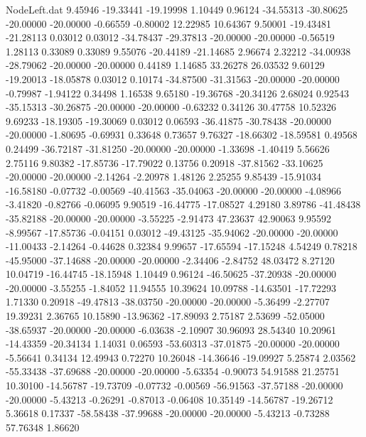 \begin{filecontents}{NodeLeft.dat}
   9.45946  -19.33441  -19.19998     1.10449    0.96124  -34.55313  -30.80625  -20.00000  -20.00000   -0.66559   -0.80002   12.22985   10.64367
   9.50001  -19.43481  -21.28113     0.03012    0.03012  -34.78437  -29.37813  -20.00000  -20.00000   -0.56519    1.28113    0.33089    0.33089
   9.55076  -20.44189  -21.14685     2.96674    2.32212  -34.00938  -28.79062  -20.00000  -20.00000    0.44189    1.14685   33.26278   26.03532
   9.60129  -19.20013  -18.05878     0.03012    0.10174  -34.87500  -31.31563  -20.00000  -20.00000   -0.79987   -1.94122    0.34498    1.16538
   9.65180  -19.36768  -20.34126     2.68024    0.92543  -35.15313  -30.26875  -20.00000  -20.00000   -0.63232    0.34126   30.47758   10.52326
   9.69233  -18.19305  -19.30069     0.03012    0.06593  -36.41875  -30.78438  -20.00000  -20.00000   -1.80695   -0.69931    0.33648    0.73657
   9.76327  -18.66302  -18.59581     0.49568    0.24499  -36.72187  -31.81250  -20.00000  -20.00000   -1.33698   -1.40419    5.56626    2.75116
   9.80382  -17.85736  -17.79022     0.13756    0.20918  -37.81562  -33.10625  -20.00000  -20.00000   -2.14264   -2.20978    1.48126    2.25255
   9.85439  -15.91034  -16.58180    -0.07732   -0.00569  -40.41563  -35.04063  -20.00000  -20.00000   -4.08966   -3.41820   -0.82766   -0.06095
   9.90519  -16.44775  -17.08527     4.29180    3.89786  -41.48438  -35.82188  -20.00000  -20.00000   -3.55225   -2.91473   47.23637   42.90063
   9.95592   -8.99567  -17.85736    -0.04151    0.03012  -49.43125  -35.94062  -20.00000  -20.00000  -11.00433   -2.14264   -0.44628    0.32384
   9.99657  -17.65594  -17.15248     4.54249    0.78218  -45.95000  -37.14688  -20.00000  -20.00000   -2.34406   -2.84752   48.03472    8.27120
  10.04719  -16.44745  -18.15948     1.10449    0.96124  -46.50625  -37.20938  -20.00000  -20.00000   -3.55255   -1.84052   11.94555   10.39624
  10.09788  -14.63501  -17.72293     1.71330    0.20918  -49.47813  -38.03750  -20.00000  -20.00000   -5.36499   -2.27707   19.39231    2.36765
  10.15890  -13.96362  -17.89093     2.75187    2.53699  -52.05000  -38.65937  -20.00000  -20.00000   -6.03638   -2.10907   30.96093   28.54340
  10.20961  -14.43359  -20.34134     1.14031    0.06593  -53.60313  -37.01875  -20.00000  -20.00000   -5.56641    0.34134   12.49943    0.72270
  10.26048  -14.36646  -19.09927     5.25874    2.03562  -55.33438  -37.69688  -20.00000  -20.00000   -5.63354   -0.90073   54.91588   21.25751
  10.30100  -14.56787  -19.73709    -0.07732   -0.00569  -56.91563  -37.57188  -20.00000  -20.00000   -5.43213   -0.26291   -0.87013   -0.06408
  10.35149  -14.56787  -19.26712     5.36618    0.17337  -58.58438  -37.99688  -20.00000  -20.00000   -5.43213   -0.73288   57.76348    1.86620

\end{filecontents}
